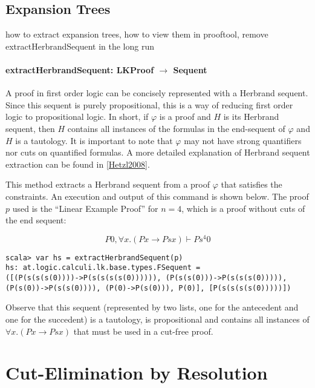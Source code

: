 \documentclass[a4paper,11pt]{article}
\newenvironment{meta}{\color{red}}{\color{black}}
\begin{document}
\subsection{Expansion Trees}

\begin{meta}
 how to extract expansion trees, how to view them in prooftool, remove extractHerbrandSequent in the long run
\end{meta}

\paragraph{\textbf{extractHerbrandSequent: LKProof $\rightarrow$ Sequent}}

A proof in first order logic can be concisely represented with a Herbrand
sequent. Since this sequent is purely propositional, this is a way of reducing
first order logic to propositional logic. In short, if $\varphi$ is a proof and
$H$ is its Herbrand sequent, then $H$ contains all instances of the formulas in
the end-sequent of $\varphi$ and $H$ is a tautology. It is important to note
that $\varphi$ may not have strong quantifiers nor cuts on quantified formulas.
A more detailed explanation of Herbrand sequent extraction can be found in
\ref{Hetzl2008}. 

This method extracts a Herbrand sequent from a proof $\varphi$ that satisfies
the constraints. 
An execution and output of this command is shown below. The proof $p$ used is the
``Linear Example Proof'' for $n=4$,
which is a proof without cuts of the end sequent:

$$P0, \forall x. (Px \rightarrow Psx) \vdash Ps^4 0$$

\begin{lstlisting}
scala> var hs = extractHerbrandSequent(p)
hs: at.logic.calculi.lk.base.types.FSequent =
([(P(s(s(s(0))))->P(s(s(s(s(0)))))), (P(s(s(0)))->P(s(s(s(0))))),
(P(s(0))->P(s(s(0)))), (P(0)->P(s(0))), P(0)], [P(s(s(s(s(0)))))])
\end{lstlisting}

Observe that this sequent (represented by two lists, one for the antecedent and
one for the succedent) is a tautology, is propositional and contains all
instances of $\forall x. (Px \rightarrow Psx)$ that must be used in a cut-free
proof.

\section{Cut-Elimination by Resolution}
\end{document}
